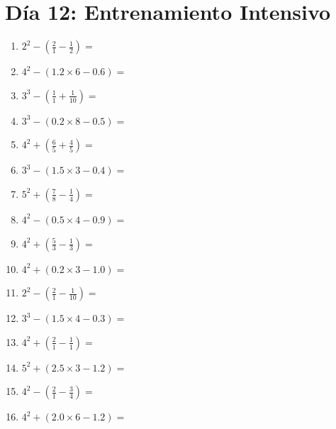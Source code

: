 \documentclass[12pt]{article}
\begin{document}
\section*{Día 12: Entrenamiento Intensivo}
\begin{enumerate}
\item \large $ 2^{2} - (\frac{2}{1} - \frac{1}{2}) = $ \vspace{1.6cm}
\item \large $ 4^{2} - (1.2 \times 6 - 0.6) = $ \vspace{1.6cm}
\item \large $ 3^{3} - (\frac{1}{1} + \frac{1}{10}) = $ \vspace{1.6cm}
\item \large $ 3^{3} - (0.2 \times 8 - 0.5) = $ \vspace{1.6cm}
\item \large $ 4^{2} + (\frac{6}{5} + \frac{4}{5}) = $ \vspace{1.6cm}
\item \large $ 3^{3} - (1.5 \times 3 - 0.4) = $ \vspace{1.6cm}
\item \large $ 5^{2} + (\frac{7}{8} - \frac{1}{4}) = $ \vspace{1.6cm}
\item \large $ 4^{2} - (0.5 \times 4 - 0.9) = $ \vspace{1.6cm}
\item \large $ 4^{2} + (\frac{5}{3} - \frac{1}{3}) = $ \vspace{1.6cm}
\item \large $ 4^{2} + (0.2 \times 3 - 1.0) = $ \vspace{1.6cm}
\newpage
\item \large $ 2^{2} - (\frac{2}{1} - \frac{1}{10}) = $ \vspace{1.6cm}
\item \large $ 3^{3} - (1.5 \times 4 - 0.3) = $ \vspace{1.6cm}
\item \large $ 4^{2} + (\frac{2}{1} - \frac{1}{1}) = $ \vspace{1.6cm}
\item \large $ 5^{2} + (2.5 \times 3 - 1.2) = $ \vspace{1.6cm}
\item \large $ 4^{2} - (\frac{2}{1} - \frac{3}{4}) = $ \vspace{1.6cm}
\item \large $ 4^{2} + (2.0 \times 6 - 1.2) = $ \vspace{1.6cm}

\end{enumerate}
\end{document}
